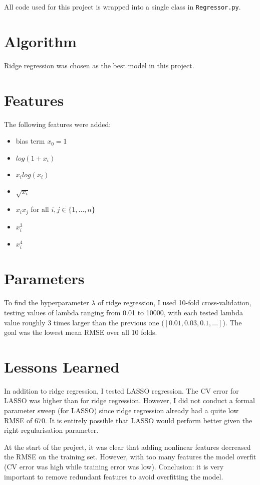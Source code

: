 \documentclass[a4paper, 11pt]{article}
\begin{document}
All code used for this project is wrapped into a single class in \verb+Regressor.py+.

\section{Algorithm}
Ridge regression was chosen as the best model in this project.

\section{Features}
The following features were added:
\label{sec:features}
\begin{itemize}
		\item bias term $x_0=1$
		\item $log(1 + x_i)$
		\item $x_i log(x_i)$
		\item $\sqrt{x_i}$
		\item $x_i x_j$ for all $i,j \in \{1,...,n\}$
		\item $x_i^3$
		\item $x_i^4$
	\end{itemize}

\section{Parameters}
To find the hyperparameter $\lambda$ of ridge regression, I used 10-fold cross-validation, testing values of lambda ranging from 0.01 to 10000, with each tested lambda value roughly 3 times larger than the previous one ($[0.01, 0.03, 0.1, ...]$). The goal was the lowest mean RMSE over all 10 folds.

\section{Lessons Learned}
In addition to ridge regression, I tested LASSO regression. The CV error for LASSO was higher than for ridge regression. However, I did not conduct a formal parameter sweep (for LASSO) since ridge regression already had a quite low RMSE of $670$. It is entirely possible that LASSO would perform better given the right regularisation parameter.

At the start of the project, it was clear that adding nonlinear features decreased the RMSE on the training set. However, with too many features the model overfit (CV error was high while training error was low). Conclusion: it is very important to remove redundant features to avoid overfitting the model.
\end{document}

